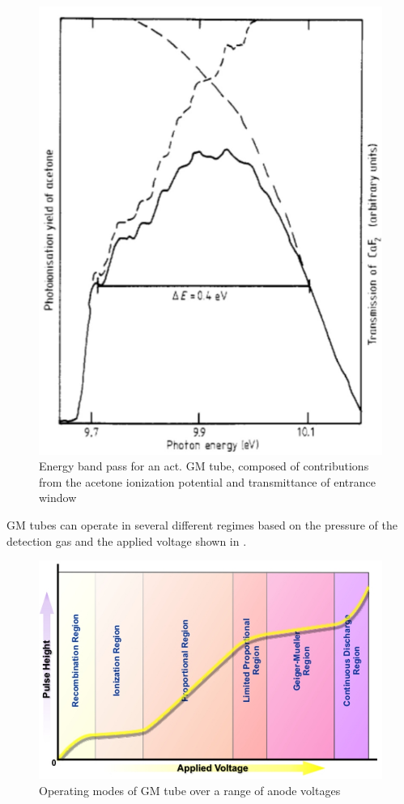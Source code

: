 \clearpage
\begin{figure}[h!]
    \centering
    \includegraphics[scale=0.5]{Figs/bandpass.png}
    \caption{Energy band pass for an act.  GM tube, composed of contributions from the acetone ionization potential and transmittance of entrance window\cite{funnemann198610}}
    \label{fig:bandpass}
\end{figure}

GM tubes can operate in several different regimes based on the pressure of the detection gas and the applied voltage shown in .

\begin{figure}[h!]
    \centering
    \includegraphics[scale=0.6]{Figs/gmmodes.jpg}
    \caption{Operating modes of GM tube over a range of anode voltages\cite{Conceptual}}
    \label{fig:gmmodes}
\end{figure}

